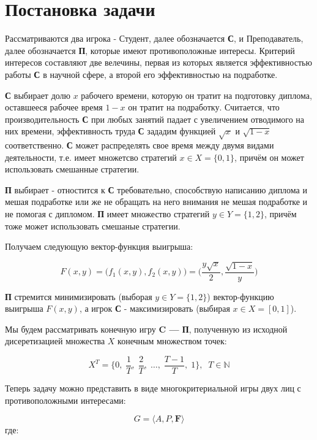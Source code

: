 \section{Постановка задачи}

Рассматриваются два игрока - Студент, далее обозначается \textbf{С},
и Преподаватель, далее обозначается \textbf{П}, которые имеют противоположные интересы.
Критерий интересов составляют две велечины, первая из которых является эффективностью
работы \textbf{С} в научной сфере, а второй его эффективностью на подработке.

\textbf{С} выбирает долю $x$ рабочего времени, которую он тратит на подготовку
диплома, оставшееся рабочее время $1-x$ он тратит на подработку. Считается, что производительность \textbf{С} при любых занятий падает с увеличением 
отводимого на них времени, эффективность труда \textbf{С} зададим функцией $\sqrt{x}$
и $\sqrt{1-x}$ соответственно. \textbf{С} может распределять свое время между двумя 
видами деятельности, т.е. имеет множетсво стратегий $x\in X = \{0, 1\}$, 
причём он может использовать смешанные стратегии.

\textbf{П} выбирает - отностится к \textbf{С} требовательно, способствую 
написанию диплома и мешая подработке или же не обращать на него внимания не 
мешая подработке и не помогая с дипломом. \textbf{П} имеет множество стратегий 
$y \in Y=\{1, 2\}$, причём тоже может использовать смешаные стратегии.

Получаем следующую вектор-функция выигрыша:

\begin{equation}
	F(x, y)=
	\big(f_1(x,y), f_2(x,y)\big) =
	\Big(
		\frac{y\sqrt{x}}2,
		\frac{\sqrt{1-x}}y
	\Big)
	\label{eq:player_criterion}
\end{equation}

\textbf{П} стремится минимизировать (выборая $y \in Y = \{1,2\}$)
вектор-функцию выигрыша $F(x, y)$, а игрок \textbf{С} - максимизировать
 (выбирая $x \in X=[0,1]$).

Мы будем рассматривать конечную игру \textbf{C --- П}, полученную из исходной дисеретизацией множества $X$ конечным множеством точек:

$$
	X^T = \{
		0, \; 
		\frac{1}{T}, \; 
		\frac{2}{T}, \; 
		\ldots, \; 
		\frac{T-1}{T}, \;
		1
	\}, \;\; T \in \mathbb{N}
$$

Теперь задачу можно представить в виде многокритериальной игры двух лиц 
с противоположными интересами:


\begin{equation}
	G = \big \langle A, P, \textbf{F} \big \rangle
\end{equation}
	где: 
 
